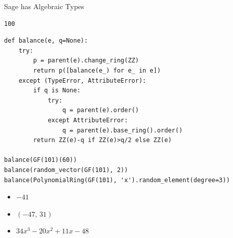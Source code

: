 \documentclass[presentation,smaller]{beamer}
\begin{document}
\begin{frame}{Sage has Algebraic Types}
\begin{verbatim}
100
\end{verbatim}

\framebreak

\lstset{language=sage,label= ,caption= ,captionpos=b,numbers=none}
\begin{lstlisting}
def balance(e, q=None):
    try:
        p = parent(e).change_ring(ZZ)
        return p([balance(e_) for e_ in e])
    except (TypeError, AttributeError):
        if q is None:
            try:
                q = parent(e).order()
            except AttributeError:
                q = parent(e).base_ring().order()
        return ZZ(e)-q if ZZ(e)>q/2 else ZZ(e)

balance(GF(101)(60))
balance(random_vector(GF(101), 2))
balance(PolynomialRing(GF(101), 'x').random_element(degree=3))
\end{lstlisting}

\begin{itemize}
\item \(-41\)
\item \(\left(-47,\,31\right)\)
\item \(34x^{3} - 20x^{2} + 11x - 48\)
\end{itemize}
\end{frame}
\end{document}
